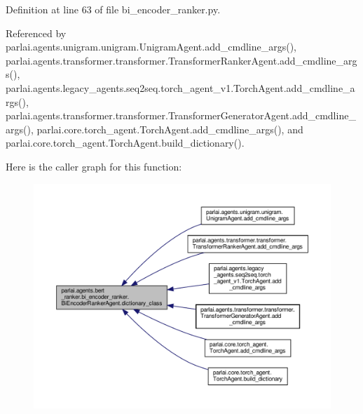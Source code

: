 Definition at line 63 of file bi\+\_\+encoder\+\_\+ranker.\+py.



Referenced by parlai.\+agents.\+unigram.\+unigram.\+Unigram\+Agent.\+add\+\_\+cmdline\+\_\+args(), parlai.\+agents.\+transformer.\+transformer.\+Transformer\+Ranker\+Agent.\+add\+\_\+cmdline\+\_\+args(), parlai.\+agents.\+legacy\+\_\+agents.\+seq2seq.\+torch\+\_\+agent\+\_\+v1.\+Torch\+Agent.\+add\+\_\+cmdline\+\_\+args(), parlai.\+agents.\+transformer.\+transformer.\+Transformer\+Generator\+Agent.\+add\+\_\+cmdline\+\_\+args(), parlai.\+core.\+torch\+\_\+agent.\+Torch\+Agent.\+add\+\_\+cmdline\+\_\+args(), and parlai.\+core.\+torch\+\_\+agent.\+Torch\+Agent.\+build\+\_\+dictionary().

Here is the caller graph for this function\+:
\nopagebreak
\begin{figure}[H]
\begin{center}
\leavevmode
\includegraphics[width=350pt]{classparlai_1_1agents_1_1bert__ranker_1_1bi__encoder__ranker_1_1BiEncoderRankerAgent_a7920edd41a6bdbd18e9a0c50a1953f9d_icgraph}
\end{center}
\end{figure}
\mbox{\label{classparlai_1_1agents_1_1bert__ranker_1_1bi__encoder__ranker_1_1BiEncoderRankerAgent_a98361c5172041c64dc2da76ab9b654a7}} 
